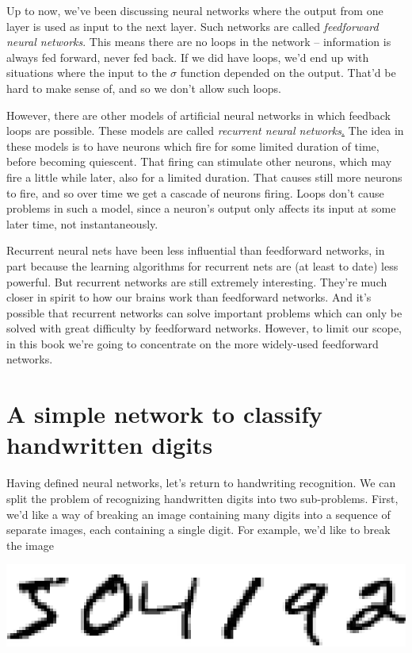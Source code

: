 \documentclass[a4paper,12pt]{report}%
\begin{document}
Up to now, we've been discussing neural networks where the output from one layer is used as input to the next layer. Such networks are called {\it feedforward neural networks}. This means there are no loops in the network -- information is always fed forward, never fed back. If we did have loops, we'd end up with situations where the input to the $\sigma$ function depended on the output. That'd be hard to make sense of, and so we don't allow such loops.

However, there are other models of artificial neural networks in which feedback loops are possible. These models are called {\it recurrent neural networks}\href{https://en.wikipedia.org/wiki/Recurrent_neural_network}. The idea in these models is to have neurons which fire for some limited duration of time, before becoming quiescent. That firing can stimulate other neurons, which may fire a little while later, also for a limited duration. That causes still more neurons to fire, and so over time we get a cascade of neurons firing. Loops don't cause problems in such a model, since a neuron's output only affects its input at some later time, not instantaneously.

Recurrent neural nets have been less influential than feedforward networks, in part because the learning algorithms for recurrent nets are (at least to date) less powerful. But recurrent networks are still extremely interesting. They're much closer in spirit to how our brains work than feedforward networks. And it's possible that recurrent networks can solve important problems which can only be solved with great difficulty by feedforward networks. However, to limit our scope, in this book we're going to concentrate on the more widely-used feedforward networks.

\section{A simple network to classify handwritten digits}
Having defined neural networks, let's return to handwriting recognition. We can split the problem of recognizing handwritten digits into two sub-problems. First, we'd like a way of breaking an image containing many digits into a sequence of separate images, each containing a single digit. For example, we'd like to break the image
\begin{center}
 \includegraphics[width=0.4\linewidth]{images/digits.png}
\end{center}
\end{document}

